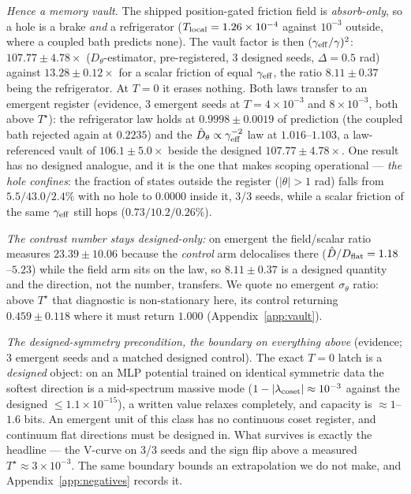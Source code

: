 \documentclass{article}
\begin{document}
\emph{Hence a memory vault.} The shipped position-gated friction field is \emph{absorb-only}, so a hole is a brake \emph{and} a refrigerator ($T_{\rm local}=1.26\times10^{-4}$ against $10^{-3}$ outside, where a coupled bath predicts none). The vault factor is then $(\gamma_{\rm eff}/\gamma)^2$: $107.77\pm4.78\times$ ($D_\theta$-estimator, pre-registered, 3 designed seeds, $\Delta=0.5$ rad) against $13.28\pm0.12\times$ for a scalar friction of equal $\gamma_{\rm eff}$, the ratio $8.11\pm0.37$ being the refrigerator. At $T=0$ it erases nothing. Both laws transfer to an emergent register (evidence, 3 emergent seeds at $T=4\times10^{-3}$ and $8\times10^{-3}$, both above $T^\star$): the refrigerator law holds at $0.9998\pm0.0019$ of prediction (the coupled bath rejected again at $0.2235$) and the $\hat D_\theta\propto\gamma_{\rm eff}^{-2}$ law at $1.016$--$1.103$, a law-referenced vault of $106.1\pm5.0\times$ beside the designed $107.77\pm4.78\times$. One result has no designed analogue, and it is the one that makes scoping operational --- \emph{the hole confines}: the fraction of states outside the register ($|\theta|>1$ rad) falls from $5.5/43.0/2.4\%$ with no hole to $0.0000$ inside it, 3/3 seeds, while a scalar friction of the same $\gamma_{\rm eff}$ still hops ($0.73/10.2/0.26\%$). {\emph{The contrast number stays designed-only:} on emergent the field/scalar ratio measures $23.39\pm10.06$ because the \emph{control} arm delocalises there ($\hat D/D_{\rm flat}=1.18$--$5.23$) while the field arm sits on the law, so $8.11\pm0.37$ is a designed quantity and the direction, not the number, transfers. We quote no emergent $\sigma_\theta$ ratio: above $T^\star$ that diagnostic is non-stationary here, its control returning $0.459\pm0.118$ where it must return $1.000$ (Appendix~\ref{app:vault}).\par} \emph{The designed-symmetry precondition, the boundary on everything above} (evidence; 3 emergent seeds and a matched designed control). The exact $T=0$ latch is a \emph{designed} object: on an MLP potential trained on identical symmetric data the softest direction is a mid-spectrum massive mode ($1-|\lambda_{\rm coset}|\approx10^{-3}$ against the designed $\le1.1\times10^{-15}$), a written value relaxes completely, and capacity is $\approx1$--$1.6$ bits. An emergent unit of this class has no continuous coset register, and continuum flat directions must be designed in. What survives is exactly the headline --- the V-curve on 3/3 seeds and the sign flip above a measured $T^\star\approx3\times10^{-3}$. The same boundary bounds an extrapolation we do not make, and Appendix~\ref{app:negatives} records it.
\end{document}
